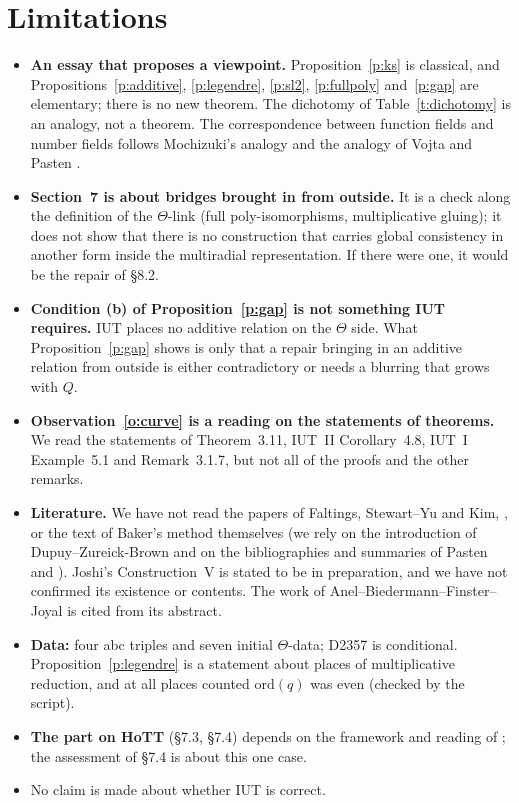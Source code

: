 \documentclass[11pt,a4paper]{article}
\numberwithin{table}{section}
\theoremstyle{plain}
\theoremstyle{definition}
\begin{document}
\section{Limitations}
\begin{itemize}
\item \textbf{An essay that proposes a viewpoint.} Proposition~\ref{p:ks} is classical, and
Propositions~\ref{p:additive}, \ref{p:legendre}, \ref{p:sl2}, \ref{p:fullpoly} and~\ref{p:gap} are elementary; there is
no new theorem. The dichotomy of Table~\ref{t:dichotomy} is an analogy, not a theorem. The correspondence between
function fields and number fields follows Mochizuki's analogy \cite{Alien} and the analogy of Vojta and Pasten
\cite{Pa}.
\item \textbf{Section~7 is about bridges brought in from outside.} It is a check along the definition of the
$\Theta$-link (full poly-isomorphisms, multiplicative gluing); it does not show that there is no construction that
carries global consistency in another form inside the multiradial representation. If there were one, it would be the
repair of \S8.2.
\item \textbf{Condition (b) of Proposition~\ref{p:gap} is not something IUT requires.} IUT places no additive relation
on the $\Theta$ side. What Proposition~\ref{p:gap} shows is only that a repair bringing in an additive relation from
outside is either contradictory or needs a blurring that grows with $Q$.
\item \textbf{Observation~\ref{o:curve} is a reading on the statements of theorems.} We read the statements of
Theorem~3.11, IUT~II Corollary~4.8, IUT~I Example~5.1 and Remark~3.1.7, but not all of the proofs and the other remarks.
\item \textbf{Literature.} We have not read the papers of Faltings, Stewart--Yu and Kim, \cite{GenEll}, or the text of
Baker's method themselves (we rely on the introduction of Dupuy--Zureick-Brown and on the bibliographies and summaries
of Pasten and \cite{Alien}). Joshi's Construction~V is stated to be in preparation, and we have not confirmed its
existence or contents. The work of Anel--Biedermann--Finster--Joyal is cited from its abstract.
\item \textbf{Data:} four abc triples and seven initial $\Theta$-data; D2357 is conditional. Proposition~\ref{p:legendre}
is a statement about places of multiplicative reduction, and at all places counted $\mathrm{ord}(q)$ was even (checked by
the script).
\item \textbf{The part on HoTT} (\S7.3, \S7.4) depends on the framework and reading of \cite{SL}; the assessment of
\S7.4 is about this one case.
\item No claim is made about whether IUT is correct.
\end{itemize}
\end{document}

